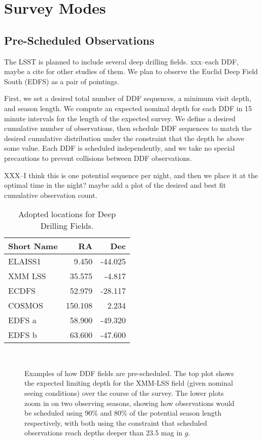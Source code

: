 \documentclass[]{aastex631}
\begin{document}
\section{Survey Modes}

\subsection{Pre-Scheduled Observations}
The LSST is planned to include several deep drilling fields. xxx--each DDF, maybe a cite for other studies of them. We plan to observe the Euclid Deep Field South (EDFS) as a pair of pointings. 

First, we set a desired total number of DDF sequences, a minimum visit depth, and season length. We compute an expected nominal depth for each DDF in 15 minute intervals for the length of the expected survey. We define a desired cumulative number of observations, then schedule DDF sequences to match the desired cumulative distribution under the constraint that the depth be above some value. Each DDF is scheduled independently, and we take no special precautions to prevent collisions between DDF observations. 

XXX--I think this is one potential sequence per night, and then we place it at the optimal time in the night? maybe add a plot of the desired and best fit cumulative observation count.


\begin{table}
    \centering
        \begin{tabular}{lrr}
            \toprule
            Short Name & RA & Dec \\
            \midrule
            ELAISS1 & 9.450 & -44.025 \\
            XMM LSS & 35.575 & -4.817 \\
            ECDFS & 52.979 & -28.117 \\
            COSMOS & 150.108 & 2.234 \\
            EDFS a & 58.900 & -49.320 \\
            EDFS b & 63.600 & -47.600 \\
            \bottomrule
            \end{tabular}
    \caption{Adopted locations for Deep Drilling Fields.}
    \label{tab:ddf_loc}
\end{table}


\begin{figure}
    \\
    \caption{Examples of how DDF fields are pre-scheduled. The top plot shows the expected limiting depth for the XMM-LSS field (given nominal seeing conditions) over the course of the survey. The lower plots zoom in on two observing seasons, showing how observations would be scheduled using 90\% and 80\% of the potential season length respectively, with both using the constraint that scheduled observations reach depths deeper than 23.5 mag in $g$.}
    \label{fig:ddf_examples}
\end{figure}
\end{document}
